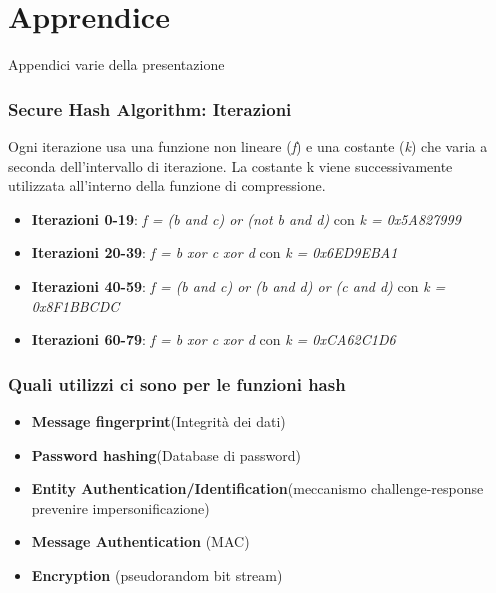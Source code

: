 \section{Apprendice}

\begin{frame}[plain]
	\begin{center}
		{\Huge Appendici varie della presentazione}
	\end{center}
\end{frame}

\begin{frame}
	\frametitle{Secure Hash Algorithm: Iterazioni}

	Ogni iterazione usa una funzione non lineare (\textit{f}) e una costante (\textit{k}) che varia a seconda dell'intervallo di iterazione.
	La costante k viene successivamente utilizzata all'interno della funzione di compressione.

	\begin{itemize}
		\item \textbf{Iterazioni 0-19}: \textit{f = (b and c) or (not b and d)} con \textit{k = 0x5A827999}
		\item \textbf{Iterazioni 20-39}: \textit{f = b xor c xor d} con \textit{k = 0x6ED9EBA1}
		\item \textbf{Iterazioni 40-59}: \textit{f = (b and c) or (b and d) or (c and d)} con \textit{k = 0x8F1BBCDC}
		\item \textbf{Iterazioni 60-79}: \textit{f = b xor c xor d} con \textit{k = 0xCA62C1D6}
	\end{itemize}

\end{frame}

\begin{frame}
	\frametitle{Quali utilizzi ci sono per le funzioni hash}
	\begin{itemize}
		\item \textbf{Message fingerprint}(Integrità dei dati)
		\item \textbf{Password hashing}(Database di password)
		\item \textbf{Entity Authentication/Identification}(meccanismo challenge-response prevenire impersonificazione)
		\item \textbf{Message Authentication} (MAC)
		\item \textbf{Encryption} (pseudorandom bit stream)
	\end{itemize}
\end{frame}

